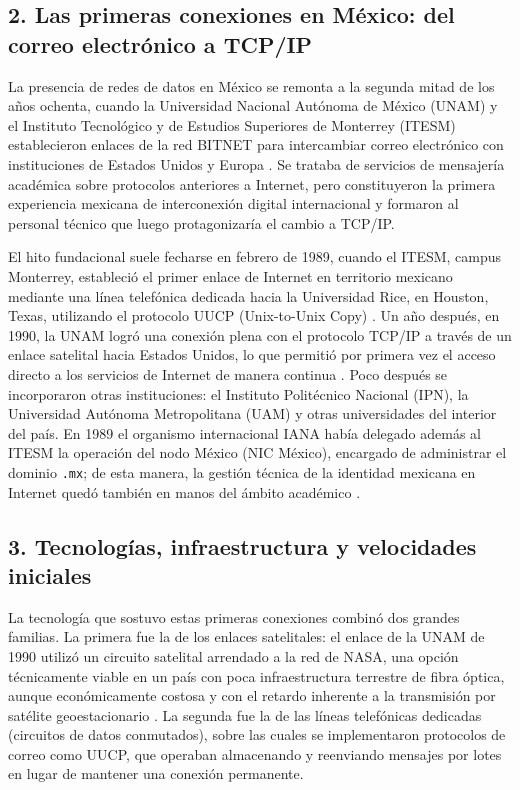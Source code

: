 \documentclass[11pt,a4paper]{article}
\begin{document}
\subsection*{2. Las primeras conexiones en México: del correo electrónico a TCP/IP}

La presencia de redes de datos en México se remonta a la segunda mitad de los
años ochenta, cuando la Universidad Nacional Autónoma de México (UNAM) y el
Instituto Tecnológico y de Estudios Superiores de Monterrey (ITESM)
establecieron enlaces de la red BITNET para intercambiar correo electrónico
con instituciones de Estados Unidos y Europa \cite{cudi}. Se trataba de
servicios de mensajería académica sobre protocolos anteriores a Internet, pero
constituyeron la primera experiencia mexicana de interconexión digital
internacional y formaron al personal técnico que luego protagonizaría el
cambio a TCP/IP.

El hito fundacional suele fecharse en febrero de 1989, cuando el ITESM, campus
Monterrey, estableció el primer enlace de Internet en territorio mexicano
mediante una línea telefónica dedicada hacia la Universidad Rice, en Houston,
Texas, utilizando el protocolo UUCP (Unix-to-Unix Copy) \cite{tec}. Un año después, en 1990, la UNAM logró una conexión plena
con el protocolo TCP/IP a través de un enlace satelital hacia Estados Unidos,
lo que permitió por primera vez el acceso directo a los servicios de Internet
de manera continua \cite{unam}. Poco después se incorporaron otras
instituciones: el Instituto Politécnico Nacional (IPN), la Universidad Autónoma
Metropolitana (UAM) y otras universidades del interior del país. En 1989 el
organismo internacional IANA había delegado además al ITESM la operación del
nodo México (NIC México), encargado de administrar el dominio \texttt{.mx};
de esta manera, la gestión técnica de la identidad mexicana en Internet quedó
también en manos del ámbito académico \cite{nic}.

\subsection*{3. Tecnologías, infraestructura y velocidades iniciales}

La tecnología que sostuvo estas primeras conexiones combinó dos grandes
familias. La primera fue la de los enlaces satelitales: el enlace de la UNAM
de 1990 utilizó un circuito satelital arrendado a la red de NASA, una opción
técnicamente viable en un país con poca infraestructura terrestre de fibra
óptica, aunque económicamente costosa y con el retardo inherente a la
transmisión por satélite geoestacionario \cite{cudi}. La segunda fue la de
las líneas telefónicas dedicadas (circuitos de datos conmutados), sobre las
cuales se implementaron protocolos de correo como UUCP, que operaban
almacenando y reenviando mensajes por lotes en lugar de mantener una conexión
permanente.
\end{document}
